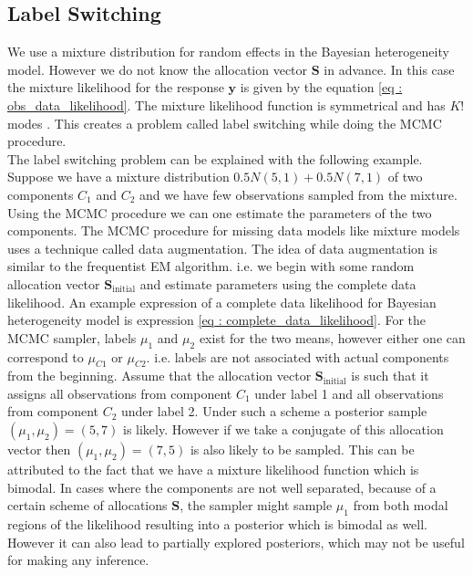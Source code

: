 \subsection{Label Switching}
\label{subsec : label_switching_blmm}
We use a mixture distribution for random effects in the Bayesian heterogeneity model. However we do not know the allocation vector $\boldsymbol{S}$ in advance. In this case the mixture likelihood for the response $\boldsymbol{y}$ is given by the equation \ref{eq : obs_data_likelihood}. The mixture likelihood function is symmetrical and has $K!$ modes \citep[pg. 44]{fruhwirth-schnatter_finite_2013}. This creates a problem called label switching while doing the MCMC procedure.\\

The label switching problem can be explained with the following example. Suppose we have a mixture distribution $0.5N(5,1) + 0.5N(7,1)$ of two components $C_1$ and $C_2$ and we have few observations sampled from the mixture. Using the MCMC procedure we can one estimate the parameters of the two components. The MCMC procedure for missing data models like mixture models uses a technique called data augmentation. The idea of data augmentation is similar to the frequentist EM algorithm. i.e. we begin with some random allocation vector $\boldsymbol{S}_\text{initial}$ and estimate parameters using the complete data likelihood. An example expression of a complete data likelihood for Bayesian heterogeneity model is expression \ref{eq : complete_data_likelihood}. For the MCMC sampler, labels $\mu_1$ and $\mu_2$ exist for the two means, however either one can correspond to $\mu_{C1}$ or $\mu_{C2}$. i.e. labels are not associated with actual components from the beginning. Assume that the allocation vector $\boldsymbol{S}_\text{initial}$ is such that it assigns all observations from component $C_1$ under label 1 and all observations from component $C_2$ under label 2. Under such a scheme a posterior sample $(\mu_1,\mu_2) = (5,7)$ is likely. However if we take a conjugate of this allocation vector then $(\mu_1,\mu_2) = (7,5)$ is also likely to be sampled. This can be attributed to the fact that we have a mixture likelihood function which is bimodal. In cases where the components are not well separated, because of a certain scheme of allocations $\boldsymbol{S}$, the sampler might sample $\mu_1$ from both modal regions of the likelihood resulting into a posterior which is bimodal as well. However it can also lead to partially explored posteriors, which may not be useful for making any inference.

